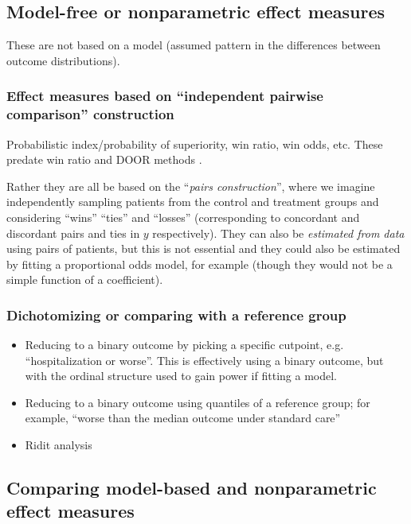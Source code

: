 \documentclass[
  11pt,
  fleqn
]{article}
\begin{document}
\subsection{Model-free or nonparametric effect measures}

These are not based on a model (assumed pattern in the differences
between outcome distributions).

\subsubsection{Effect measures based on ``independent pairwise
comparison'' construction}

Probabilistic index/probability of
superiority, win ratio, win odds, etc. These predate win ratio and DOOR methods
\citep[e.g.][p.~14]{agrestiAnalysisOrdinalCategorical2010}.

Rather they are all be based on the ``\emph{pairs construction}'',
where we imagine independently sampling patients from the control and
treatment groups and considering ``wins'' ``ties'' and ``losses''
(corresponding to concordant and discordant pairs and ties in $y$
respectively). They can
also be \emph{estimated from data} using pairs of patients, but this
is not essential and they could also be estimated by fitting a
proportional odds model, for example (though they would not be a
simple function of a coefficient).

\subsubsection{Dichotomizing or comparing with a reference group}

\begin{itemize}
  \item Reducing to a binary outcome by picking a specific cutpoint,
    e.g. ``hospitalization or
    worse''. This is effectively using a binary outcome, but with the
    ordinal structure used to gain power if fitting a model.
  \item Reducing to a binary outcome using quantiles of a reference
    group; for example,
    ``worse than the median outcome under standard care''
  \item Ridit analysis
    \citep{brossHowUseRidit1958,agrestiAnalysisOrdinalCategorical2010,
    smithsonReceiverOperatingCharacteristic2023, jansenRiditAnalysisReview1984}
\end{itemize}

\subsection{Comparing model-based and nonparametric effect measures}
\end{document}
